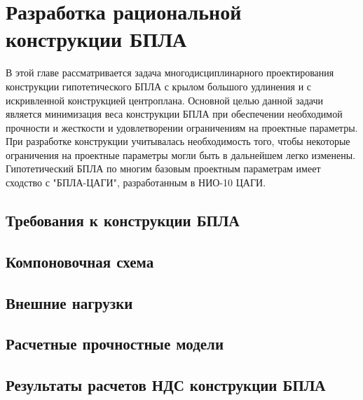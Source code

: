 \chapter{Разработка рациональной конструкции БПЛА}

В этой главе рассматривается задача многодисциплинарного проектирования конструкции гипотетического БПЛА с крылом большого удлинения и с искривленной конструкцией центроплана.  Основной целью данной задачи является минимизация веса конструкции БПЛА при обеспечении необходимой прочности и жесткости и удовлетворении ограничениям на проектные параметры. При разработке конструкции учитывалась необходимость того, чтобы некоторые ограничения на проектные параметры могли быть в дальнейшем легко изменены. Гипотетический БПЛА по многим базовым проектным параметрам имеет сходство с "БПЛА-ЦАГИ", разработанным в НИО-10 ЦАГИ.


\section{Требования к конструкции БПЛА}



\section{Компоновочная схема}
	

\section{Внешние нагрузки}
\label{sec:externalLoads}



\section{Расчетные прочностные модели}




\section{Результаты расчетов НДС конструкции БПЛА} 


%